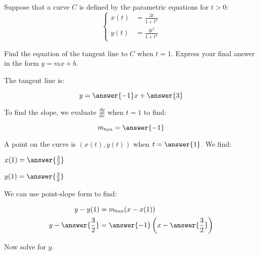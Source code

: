 \documentclass{ximera}
\author{Alex Beckwith}
\begin{document}
\begin{exercise}
Suppose that a curve $C$ is defined by the parametric equations for $t>0$:
\[
\begin{cases}
x(t) &= \frac{3t}{1+t^3}\\[2ex]
y(t) &= \frac{3t^2}{1+t^3}
\end{cases}
\]

Find the equation of the tangent line to $C$ when $t = 1$.  Express your final answer in the form $y=mx+b$.

The tangent line is:

\[
y = \answer{-1}x+\answer{3}
\]

\begin{hint}
To find the slope, we evaluate $\frac{dy}{dx}$ when $t=1$ to find:

\[
m_{tan} = \answer{-1}
\]

A point on the curve is $(x(t),y(t))$ when $t=\answer{1}$.  We find:

$x(1) = \answer{\frac{3}{2}}$

$y(1) = \answer{\frac{3}{2}}$

We can use point-slope form to find:

\begin{align*}
y-y(1) &= m_{tan}(x-x(1)) \\
y- \answer{\frac{3}{2}} &= \answer{-1} \left( x-\answer{\frac{3}{2}} \right)
\end{align*}

Now solve for $y$.

\end{hint}
\end{exercise}
\end{document}
